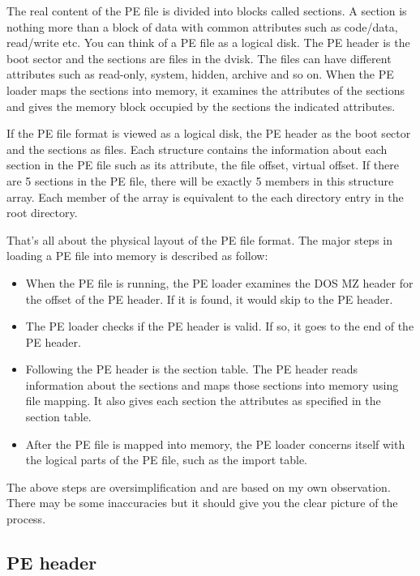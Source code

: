 The real content of the PE file is divided into blocks called sections. A section is nothing more than a block of data with common attributes such as code/data, read/write etc. You can think of a PE file as a logical disk. The PE header is the boot sector and the sections are files in the dvisk. The files can have different attributes such as read-only, system, hidden, archive and so on. When the PE loader maps the sections into memory, it examines the attributes of the sections and gives the memory block occupied by the sections the indicated attributes.

If the PE file format is viewed as a logical disk, the PE header as the boot sector and the sections as files. Each structure contains the information about each section in the PE file such as its attribute, the file offset, virtual offset. If there are 5 sections in the PE file, there will be exactly 5 members in this structure array. Each member of the array is equivalent to the each directory entry in the root directory.

That's all about the physical layout of the PE file format. The major steps in loading a PE file into memory is described as follow:

\begin{itemize}
\item When the PE file is running, the PE loader examines the DOS MZ header for the offset of the PE header. If it is found, it would skip to the PE header.
\item The PE loader checks if the PE header is valid. If so, it goes to the end of the PE header.
\item Following the PE header is the section table. The PE header reads information about the sections and maps those sections into memory using file mapping. It also gives each section the attributes as specified in the section table.
\item After the PE file is mapped into memory, the PE loader concerns itself with the logical parts of the PE file, such as the import table.
\end{itemize}

The above steps are oversimplification and are based on my own observation. There may be some inaccuracies but it should give you the clear picture of the process.
\subsection{PE header}

